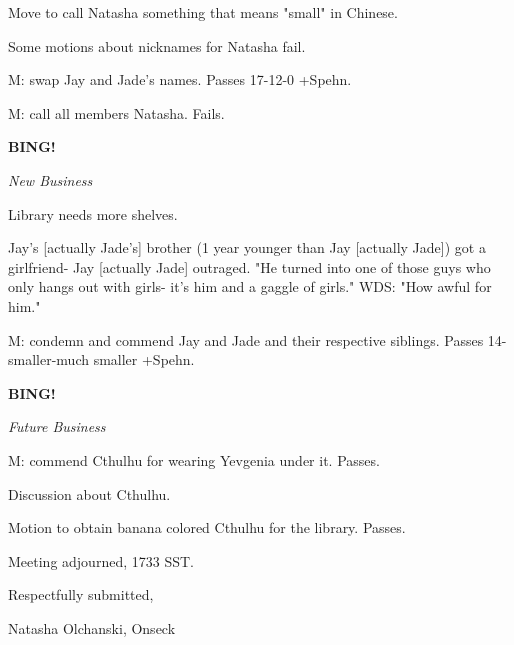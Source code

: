 \documentclass[12pt]{article}
\newcommand{\bing}{{\bf BING!} }
\newcommand{\goto}[1]{\bing \vskip 12pt \centerline{{\em{#1}}}}
\begin{document}
Move to call Natasha something that means "small" in Chinese.

Some motions about nicknames for Natasha fail.

M: swap Jay and Jade's names. Passes 17-12-0 +Spehn.

M: call all members Natasha. Fails.

\goto{New Business}

Library needs more shelves.

Jay's [actually Jade's] brother (1 year younger than Jay [actually Jade]) got a girlfriend- Jay [actually Jade] outraged. "He turned into one of those guys who only hangs out with girls- it's him and a gaggle of girls." WDS: "How awful for him."

M: condemn and commend Jay and Jade and their respective siblings. Passes 14-smaller-much smaller +Spehn.

\goto{Future Business}

M: commend Cthulhu for wearing Yevgenia under it. Passes.

Discussion about Cthulhu.

Motion to obtain banana colored Cthulhu for the library. Passes.

\vspace{12pt}

\noindent
Meeting adjourned, 1733 SST.

\vspace{18pt}

\centerline{Respectfully submitted,}
\centerline{Natasha Olchanski, Onseck}
\end{document}
